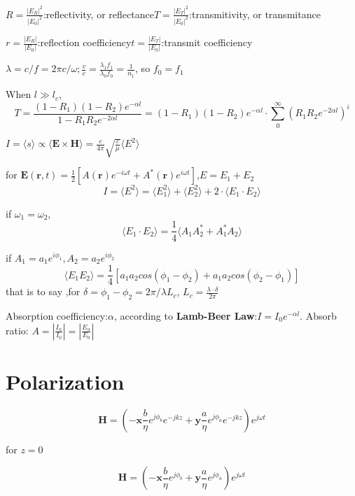 \documentclass[12pt]{book} %
\begin{document}
$\displaystyle R=\frac{|E_R|^2}{|E_0|^2}$:reflectivity, or reflectance\quad$\displaystyle T=\frac{|E_T|^2}{|E_0|^2}$:transmitivity, or transmitance

$\displaystyle r=\frac{|E_R|}{|E_0|}$:reflection coefficiency\quad$\displaystyle t=\frac{|E_T|}{|E_0|}$:transmit coefficiency

$\displaystyle \lambda=c/f=2\pi c/\omega; \frac{v}{c}=\frac{\lambda_1 f_1}{\lambda_0 f_0}=\frac{1}{n_1}$, so $f_0=f_1$

When $l\gg l_c$,
\begin{equation}\label{equa:trans}
  T=\frac{(1-R_1)(1-R_2)e^{-\alpha l}}{1-R_1R_2e^{-2\alpha l}}={(1-R_1)(1-R_2)e^{-\alpha l}}\cdot{\sum_0^\infty(R_1R_2e^{-2\alpha l})^i}
\end{equation}

$I=\langle s \rangle\propto\langle \mathbf{E}\times\mathbf{H}\rangle=\frac{c}{4\pi}\sqrt{\frac{\varepsilon}{\mu}}\langle E^2 \rangle$

 for $\mathbf{E}(\mathbf{r},t)=\frac{1}{2}[A(\mathbf{r})e^{-i\omega t}+A^*(\mathbf{r})e^{i\omega t}]$,$E=E_1+E_2$
 \begin{equation}
 I=\langle E^2 \rangle=\langle E_1^2\rangle+\langle E_2^2\rangle+2\cdot\langle E_1\cdot E_2\rangle
 \end{equation}

 if $\omega_1=\omega_2$,
 $$\langle E_1\cdot E_2\rangle=\frac{1}{4}\langle A_1A_2^*+A_1^*A_2\rangle$$

 if $A_1=a_1e^{i\phi_1},A_2=a_2e^{i\phi_2}$
 $$\langle E_1 E_2\rangle=\frac{1}{4}[a_1a_2cos(\phi_1-\phi_2)+a_1a_2cos(\phi_2-\phi_1)]$$
 that is to say ,for $\delta=\phi_1-\phi_2={2\pi}/{\lambda}L_c$, $\displaystyle L_c=\frac{\lambda\cdot\delta}{2\pi}$



Absorption coefficiency:$\alpha$, according to \textbf{Lamb-Beer Law}:$I=I_0e^{-\alpha l}$.
Absorb ratio: $\displaystyle A=|\frac{I_\alpha}{I_0}|=|\frac{E_\alpha}{E_0}|$

\section{Polarization}

$$\mathbf{H}=(-\mathbf{x}\frac{b}{\eta}e^{j\phi_b}e^{-jkz}+\mathbf{y}\frac{a}{\eta}e^{j\phi_a}e^{-jkz})e^{j\omega t}$$

for $z=0$

$$\mathbf{H}=(-\mathbf{x}\frac{b}{\eta}e^{j\phi_b}+\mathbf{y}\frac{a}{\eta}e^{j\phi_a})e^{j\omega t}$$
\end{document}
